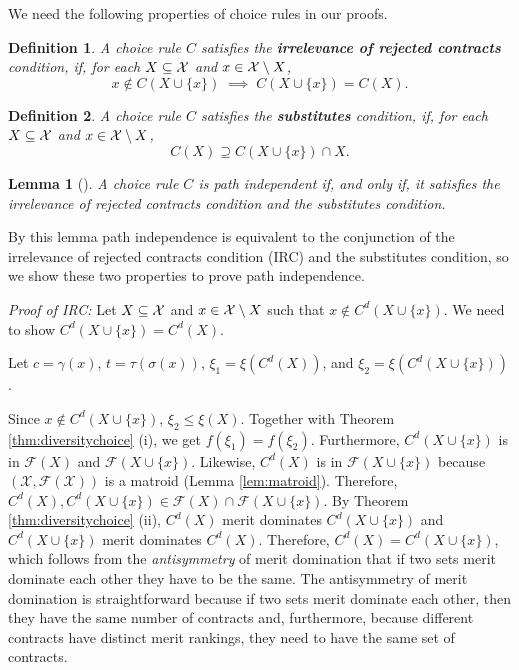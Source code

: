 \documentclass[12pt]{amsart}
\newtheorem{definition}{Definition}
\newtheorem{lemma}{Lemma}
\theoremstyle{remark}
\begin{document}
We need the following properties of choice rules in our proofs.

\begin{definition}%
A choice rule $C$ satisfies the \textbf{irrelevance of rejected contracts} condition, if, for each $X \subseteq \mathcal{X}$
and $x \in \mathcal{X} \setminus X$,
\[x\notin C(X\cup \{x\}) \; \implies \;  C(X\cup \{x\})=C(X).\]
\end{definition}

\begin{definition}%
A choice rule $C$ satisfies the \textbf{substitutes} condition, if, for each $X \subseteq \mathcal{X}$
and $x \in \mathcal{X} \setminus X$,
\[C(X) \supseteq  C(X\cup \{x\}) \cap X.\]
\end{definition}

\begin{lemma}[\cite{aizmal81}]\label{lem:pi}
A choice rule $C$ is path independent if, and only if, it satisfies the irrelevance of rejected contracts condition
and the substitutes condition.
\end{lemma}

By this lemma path independence is equivalent to the conjunction of the
irrelevance of rejected contracts condition (IRC) and the substitutes condition,
so we show these two properties to prove path independence.

\medskip
\noindent
\emph{Proof of IRC:}
Let $X \subseteq \mathcal{X}$ and $x \in \mathcal{X} \setminus X$ such that $x\notin C^d(X\cup \{x\})$. We need to show $C^d(X\cup \{x\})=C^d(X)$.

Let $c=\gamma(x)$, $t=\tau(\sigma(x))$, $\xi_1= \xi(C^d(X))$, and $\xi_2=\xi(C^d(X\cup\{x\}))$.

Since  $x \notin C^d(X\cup \{x\})$, $\xi_2 \leq \xi(X)$. Together with Theorem \ref{thm:diversitychoice} (i), we get $f(\xi_1)=f(\xi_2)$.
Furthermore, $C^d(X\cup\{x\})$ is in $\mathcal{F}(X)$ and
$\mathcal{F}(X\cup \{x\})$. Likewise, $C^d(X)$ is in $\mathcal{F}(X\cup\{x\})$ because
$(\mathcal{X},\mathcal{F}(\mathcal{X}))$ is a matroid (Lemma \ref{lem:matroid}).
Therefore, $C^d(X),C^d(X\cup\{x\}) \in \mathcal{F}(X) \cap \mathcal{F}(X\cup \{x\})$.
By Theorem \ref{thm:diversitychoice} (ii), $C^d(X)$ merit
dominates $C^d(X\cup\{x\})$ and $C^d(X\cup\{x\})$ merit dominates $C^d(X)$.
Therefore, $C^d(X)=C^d(X\cup\{x\})$, which follows from the \emph{antisymmetry} of merit domination that if two sets merit dominate each other they have
to be the same. The antisymmetry of merit domination is straightforward
because if two sets merit dominate each other,
then they have the same number of contracts and, furthermore, because different
contracts have distinct merit rankings, they need to have the
same set of contracts.
\medskip
\end{document}
